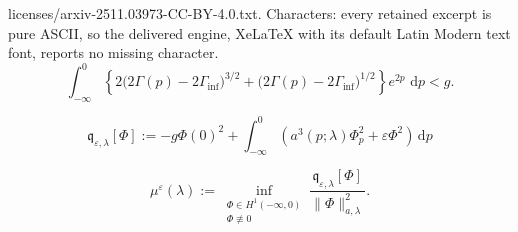 \documentclass[10pt,a4paper]{amsart}
\newcommand{\dd}{\,\mathrm{d}}
\begin{document}
licenses/arxiv-2511.03973-CC-BY-4.0.txt. Characters: every retained excerpt is pure ASCII, so the delivered engine, XeLaTeX with its default Latin Modern text font, reports no missing character.
\begin{equation}\label{eq2.bifcondition}
\int_{-\infty}^{0}
\left\{
2\bigl(2\Gamma(p)-2\Gamma_{\inf}\bigr)^{3/2}
+
\bigl(2\Gamma(p)-2\Gamma_{\inf}\bigr)^{1/2}
\right\}e^{2p}\,\dd p<g.
\end{equation}

\begin{equation}
\label{eq:quadratic-form}
\mathfrak q_{\varepsilon,\lambda}[\Phi]
:=
-g\Phi(0)^2
+
\int_{-\infty}^{0}
\left(
a^3(p;\lambda)\Phi_p^2+\varepsilon\Phi^2
\right)\dd p
\end{equation}

\begin{equation}
\label{eq:principal-Rayleigh-value}
\mu^\varepsilon(\lambda)
:=
\inf_{\substack{\Phi\in H^1(-\infty,0)\\ \Phi\not\equiv 0}}
\frac{\mathfrak q_{\varepsilon,\lambda}[\Phi]}
{\|\Phi\|_{a,\lambda}^2}.
\end{equation}
\end{document}
